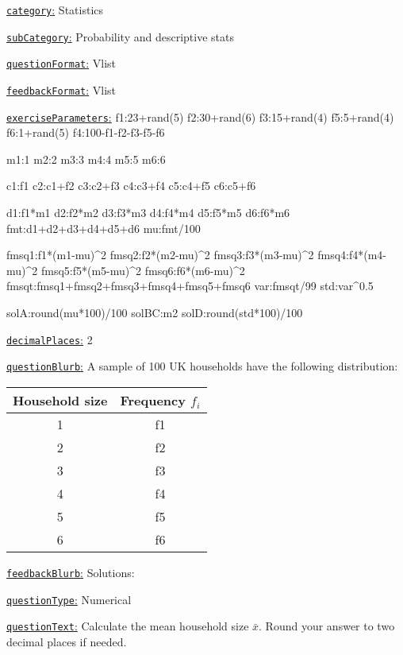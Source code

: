 \documentclass[preview]{standalone}
\newcommand \fieldname[1]{\underline{\texttt{#1}:}}
\begin{document}
\fieldname{category}  %
Statistics

\fieldname{subCategory} %
Probability and descriptive stats

\fieldname{questionFormat}
Vlist

\fieldname{feedbackFormat}
Vlist

\fieldname{exerciseParameters}
f1:23+rand(5)
f2:30+rand(6)
f3:15+rand(4)
f5:5+rand(4)
f6:1+rand(5)
f4:100-f1-f2-f3-f5-f6

m1:1
m2:2
m3:3
m4:4
m5:5
m6:6

c1:f1
c2:c1+f2
c3:c2+f3
c4:c3+f4
c5:c4+f5
c6:c5+f6

d1:f1*m1
d2:f2*m2
d3:f3*m3
d4:f4*m4
d5:f5*m5
d6:f6*m6
fmt:d1+d2+d3+d4+d5+d6
mu:fmt/100

fmsq1:f1*(m1-mu)^2
fmsq2:f2*(m2-mu)^2
fmsq3:f3*(m3-mu)^2
fmsq4:f4*(m4-mu)^2
fmsq5:f5*(m5-mu)^2
fmsq6:f6*(m6-mu)^2
fmsqt:fmsq1+fmsq2+fmsq3+fmsq4+fmsq5+fmsq6
var:fmsqt/99
std:var^0.5

solA:round(mu*100)/100
solBC:m2
solD:round(std*100)/100

\fieldname{decimalPlaces}
2

\fieldname{questionBlurb}
A sample of 100 UK households have the following distribution:

\begin{tabular}{cc}
Household size & Frequency $f_i$ \\
\hline
1 & {f1} \\
2 & {f2} \\
3 & {f3} \\
4 & {f4} \\
5 & {f5} \\
6 & {f6} \\
\hline
\end{tabular}

\fieldname{feedbackBlurb}
Solutions:

\fieldname{questionType}
Numerical

\fieldname{questionText}
Calculate the mean household size $\bar x$. Round your answer to two decimal places if needed.
\end{document}
